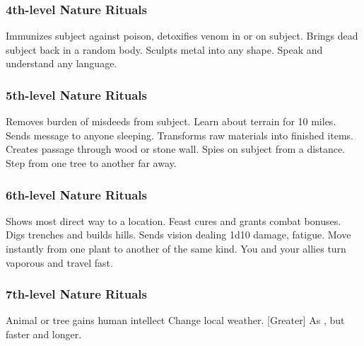 \subsubsection{4th-level Nature Rituals}
\begin{rituallist}
     Immunizes subject against poison, detoxifies venom in or on subject.
     Brings dead subject back in a random body.
     Sculpts metal into any shape.
     Speak and understand any language.
\end{rituallist}

\subsubsection{5th-level Nature Rituals}
\begin{rituallist}
    \F\M Removes burden of misdeeds from subject.
     Learn about terrain for 10 miles.
     Sends message to anyone sleeping.
     Transforms raw materials into finished items.
     Creates passage through wood or stone wall.
    \F Spies on subject from a distance.
     Step from one tree to another far away.
\end{rituallist}

\subsubsection{6th-level Nature Rituals}
\begin{rituallist}
     Shows most direct way to a location.
     Feast cures and grants combat bonuses.
     Digs trenches and builds hills.
     Sends vision dealing 1d10 damage, fatigue.
     Move instantly from one plant to another of the same kind.
     You and your allies turn vaporous and travel fast.
\end{rituallist}

\subsubsection{7th-level Nature Rituals}
\begin{rituallist}
     Animal or tree gains human intellect
     Change local weather.
    [Greater] As , but faster and longer.
\end{rituallist}

